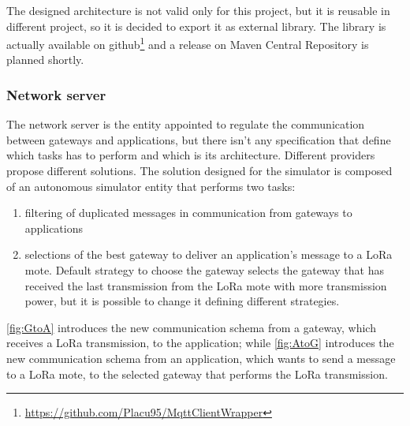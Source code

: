 \noindent The designed architecture is not valid only for this project, but it is reusable in different project, so it is decided to export it as external library. The library is actually available on github\footnote{\href{https://github.com/Placu95/MqttClientWrapper}{https://github.com/Placu95/MqttClientWrapper}} and a release on Maven Central Repository is planned shortly.

\subsubsection{Network server}
The network server is the entity appointed to regulate the communication between gateways and applications, but there isn't any specification that define which tasks has to perform and which is its architecture. 
Different providers propose different solutions. 
The solution designed for the simulator is composed of an autonomous simulator entity that performs two tasks:
\begin{enumerate}
    \item filtering of duplicated messages in communication from gateways to applications
    \item selections of the best gateway to deliver an application's message to a LoRa mote. 
    Default strategy to choose the gateway selects the gateway that has received the last transmission from the LoRa mote with more transmission power, but it is possible to change it defining different strategies. 
\end{enumerate}
\autoref{fig:GtoA} introduces the new communication schema from a gateway, which receives a LoRa transmission, to the application; while \autoref{fig:AtoG} introduces the new communication schema from an application, which wants to send a message to a LoRa mote, to the selected gateway that performs the LoRa transmission.
